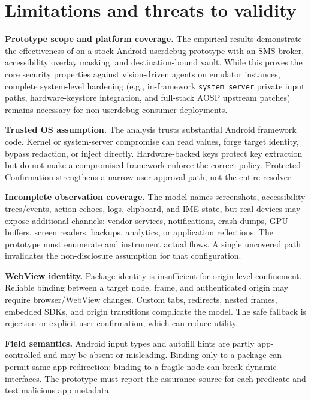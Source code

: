 \section{Limitations and threats to validity}
\label{sec:limitations}

\textbf{Prototype scope and platform coverage.} The empirical results demonstrate the effectiveness of \SH{} on a stock-Android userdebug prototype with an SMS broker, accessibility overlay masking, and destination-bound vault. While this proves the core security properties against vision-driven agents on emulator instances, complete system-level hardening (e.g., in-framework \texttt{system\_server} private input paths, hardware-keystore integration, and full-stack AOSP upstream patches) remains necessary for non-userdebug consumer deployments.

\textbf{Trusted OS assumption.} The analysis trusts substantial Android framework code. Kernel or system-server compromise can read values, forge target identity, bypass redaction, or inject directly. Hardware-backed keys protect key extraction but do not make a compromised framework enforce the correct policy. Protected Confirmation strengthens a narrow user-approval path, not the entire resolver.

\textbf{Incomplete observation coverage.} The model names screenshots, accessibility trees/events, action echoes, logs, clipboard, and IME state, but real devices may expose additional channels: vendor services, notifications, crash dumps, GPU buffers, screen readers, backups, analytics, or application reflections. The prototype must enumerate and instrument actual flows. A single uncovered path invalidates the non-disclosure assumption for that configuration.

\textbf{WebView identity.} Package identity is insufficient for origin-level confinement. Reliable binding between a target node, frame, and authenticated origin may require browser/WebView changes. Custom tabs, redirects, nested frames, embedded SDKs, and origin transitions complicate the model. The safe fallback is rejection or explicit user confirmation, which can reduce utility.

\textbf{Field semantics.} Android input types and autofill hints are partly app-controlled and may be absent or misleading. Binding only to a package can permit same-app redirection; binding to a fragile node can break dynamic interfaces. The prototype must report the assurance source for each predicate and test malicious app metadata.

